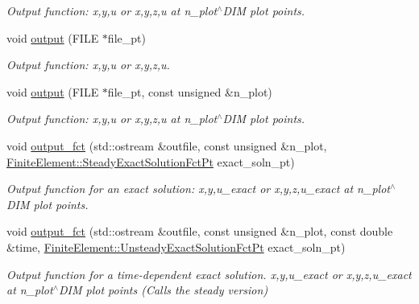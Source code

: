 \begin{DoxyCompactItemize}
\begin{DoxyCompactList}\small\item\em Output function\+: x,y,u or x,y,z,u at n\+\_\+plot$^\wedge$\+D\+IM plot points. \end{DoxyCompactList}\item 
void \hyperlink{classoomph_1_1QLinearWaveElement_a9b6c23f23a7f8e188241fe2698c7543d}{output} (F\+I\+LE $\ast$file\+\_\+pt)
\begin{DoxyCompactList}\small\item\em Output function\+: x,y,u or x,y,z,u. \end{DoxyCompactList}\item 
void \hyperlink{classoomph_1_1QLinearWaveElement_a4fe8053385a090049e459faa0e0cc3be}{output} (F\+I\+LE $\ast$file\+\_\+pt, const unsigned \&n\+\_\+plot)
\begin{DoxyCompactList}\small\item\em Output function\+: x,y,u or x,y,z,u at n\+\_\+plot$^\wedge$\+D\+IM plot points. \end{DoxyCompactList}\item 
void \hyperlink{classoomph_1_1QLinearWaveElement_af72b64dee3c8690aca4734d7f41515bc}{output\+\_\+fct} (std\+::ostream \&outfile, const unsigned \&n\+\_\+plot, \hyperlink{classoomph_1_1FiniteElement_a690fd33af26cc3e84f39bba6d5a85202}{Finite\+Element\+::\+Steady\+Exact\+Solution\+Fct\+Pt} exact\+\_\+soln\+\_\+pt)
\begin{DoxyCompactList}\small\item\em Output function for an exact solution\+: x,y,u\+\_\+exact or x,y,z,u\+\_\+exact at n\+\_\+plot$^\wedge$\+D\+IM plot points. \end{DoxyCompactList}\item 
void \hyperlink{classoomph_1_1QLinearWaveElement_af991bd517d135fe1320074b28ed84b02}{output\+\_\+fct} (std\+::ostream \&outfile, const unsigned \&n\+\_\+plot, const double \&time, \hyperlink{classoomph_1_1FiniteElement_ad4ecf2b61b158a4b4d351a60d23c633e}{Finite\+Element\+::\+Unsteady\+Exact\+Solution\+Fct\+Pt} exact\+\_\+soln\+\_\+pt)
\begin{DoxyCompactList}\small\item\em Output function for a time-\/dependent exact solution. x,y,u\+\_\+exact or x,y,z,u\+\_\+exact at n\+\_\+plot$^\wedge$\+D\+IM plot points (Calls the steady version) \end{DoxyCompactList}\end{DoxyCompactItemize}
